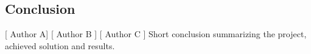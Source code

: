 \subsection{Conclusion}
[ Author A] [ Author B ] [ Author C ] 
\newline
Short conclusion summarizing the project, achieved solution and results.